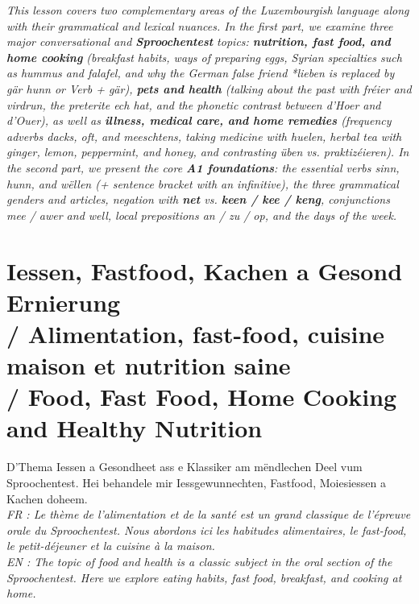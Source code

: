 \textit{This lesson covers two complementary areas of the Luxembourgish language along with their grammatical and lexical nuances. In the first part, we examine three major conversational and \textbf{Sproochentest} topics: \textbf{nutrition, fast food, and home cooking} (breakfast habits, ways of preparing eggs, Syrian specialties such as hummus and falafel, and why the German false friend \textit{*lieben} is replaced by \textit{gär hunn} or \textit{Verb + gär}), \textbf{pets and health} (talking about the past with \textit{fréier} and \textit{virdrun}, the preterite \textit{ech hat}, and the phonetic contrast between \textit{d'Hoer} and \textit{d'Ouer}), as well as \textbf{illness, medical care, and home remedies} (frequency adverbs \textit{dacks}, \textit{oft}, and \textit{meeschtens}, taking medicine with \textit{huelen}, herbal tea with ginger, lemon, peppermint, and honey, and contrasting \textit{üben} vs. \textit{praktizéieren}). In the second part, we present the core \textbf{A1 foundations}: the essential verbs \textit{sinn}, \textit{hunn}, and \textit{wëllen} (+ sentence bracket with an infinitive), the three grammatical genders and articles, negation with \textbf{net} vs. \textbf{keen / kee / keng}, conjunctions \textit{mee / awer} and \textit{well}, local prepositions \textit{an / zu / op}, and the days of the week.}

\vspace{1.5em}

\section[Iessen, Fastfood, Kachen a Gesond Ernierung / Food, Cooking and Nutrition]{Iessen, Fastfood, Kachen a Gesond Ernierung \\/ Alimentation, fast-food, cuisine maison et nutrition saine \\/ Food, Fast Food, Home Cooking and Healthy Nutrition}

D'Thema Iessen a Gesondheet ass e Klassiker am mëndlechen Deel vum Sproochentest. Hei behandele mir Iessgewunnechten, Fastfood, Moiesiessen a Kachen doheem. \\
\textit{FR : Le thème de l'alimentation et de la santé est un grand classique de l'épreuve orale du Sproochentest. Nous abordons ici les habitudes alimentaires, le fast-food, le petit-déjeuner et la cuisine à la maison.} \\
\textit{EN : The topic of food and health is a classic subject in the oral section of the Sproochentest. Here we explore eating habits, fast food, breakfast, and cooking at home.}

